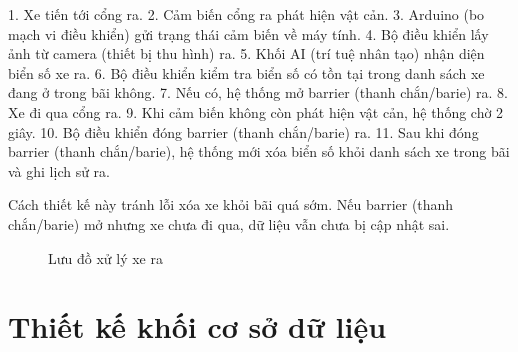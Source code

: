 \documentclass[a4paper,14pt]{extreport}
\begin{document}
1. Xe tiến tới cổng ra.
2. Cảm biến cổng ra phát hiện vật cản.
3. Arduino (bo mạch vi điều khiển) gửi trạng thái cảm biến về máy tính.
4. Bộ điều khiển lấy ảnh từ camera (thiết bị thu hình) ra.
5. Khối AI (trí tuệ nhân tạo) nhận diện biển số xe ra.
6. Bộ điều khiển kiểm tra biển số có tồn tại trong danh sách xe đang ở trong bãi không.
7. Nếu có, hệ thống mở barrier (thanh chắn/barie) ra.
8. Xe đi qua cổng ra.
9. Khi cảm biến không còn phát hiện vật cản, hệ thống chờ 2 giây.
10. Bộ điều khiển đóng barrier (thanh chắn/barie) ra.
11. Sau khi đóng barrier (thanh chắn/barie), hệ thống mới xóa biển số khỏi danh sách xe trong bãi và ghi lịch sử ra.

Cách thiết kế này tránh lỗi xóa xe khỏi bãi quá sớm. Nếu barrier (thanh chắn/barie) mở nhưng xe chưa đi qua, dữ liệu vẫn chưa bị cập nhật sai.

\begin{figure}[H]
\centering
{}
\caption{Lưu đồ xử lý xe ra}
\label{fig:xe_ra}
\end{figure}

\section{Thiết kế khối cơ sở dữ liệu}
\end{document}
